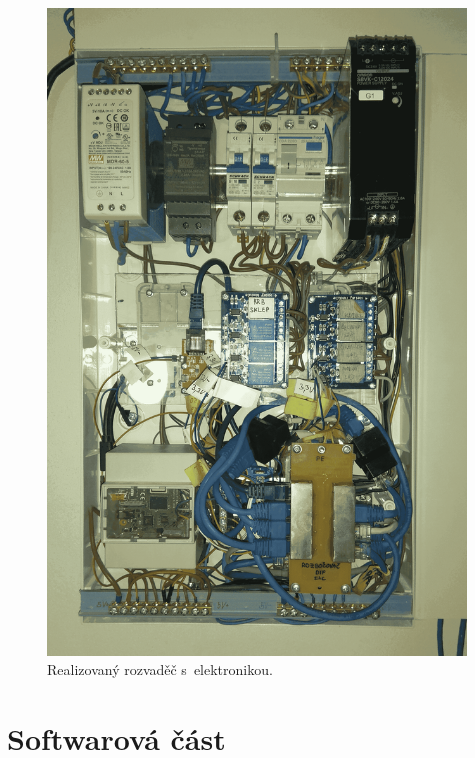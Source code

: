 \newpage

\begin{figure}[H]
    \centering
    \includegraphics[width=0.99\textwidth]{images/rozvadec-ve-sklepe-s-elektronikou.png}
    \caption{Realizovaný rozvaděč s~elektronikou.}
    \label{fig:rozvadec-ve-sklepe-s-elektronikou}
\end{figure}

\section{Softwarová část}

